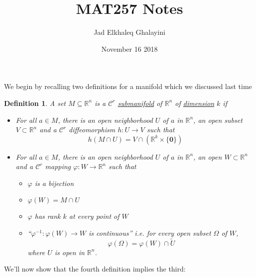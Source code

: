 \documentclass{article}
\title{MAT257 Notes}
\author{Jad Elkhaleq Ghalayini}
\date{November 16 2018}
\newtheorem{definition}{Definition}
\newcommand{\reals}[0]{\mathbb{R}}
\newcommand{\mc}[1]{\mathcal{#1}}
\newcommand{\mb}[1]{\mathbf{#1}}
\begin{document}
\maketitle

We begin by recalling two definitions for a manifold which we discussed last time
\begin{definition}
  A set \(M \subseteq \reals^n\) is a \(\mc{C}^r\) \underline{submanifold} of \(\reals^n\) of \underline{dimension} \(k\) if
  \begin{itemize}

    \item [3.] For all \(a \in M\), there is an open neighborhood \(U\) of \(a\) in \(\reals^n\), an open subset \(V \subset \reals^n\) and a \(\mc{C}^r\) diffeomorphism \(h: U \to V\) such that
    \[h(M \cap U) = V \cap (\reals^k \times \{\mb{0}\})\]

    \item [4.] For all \(a \in M\), there is an open neighborhood \(U\) of \(a\) in \(\reals^n\), an open \(W \subset \reals^n\) and a \(\mc{C}^r\) mapping \(\varphi: W \to \reals^n\) such that
    \begin{itemize}

      \item \(\varphi\) is a bijection

      \item \(\varphi(W) = M \cap U\)

      \item \(\varphi\) has rank \(k\) at every point of \(W\)

      \item ``\(\varphi^{-1}: \varphi(W) \to W\) is continuous'' i.e. for every open subset \(\Omega\) of \(W\),
      \[\varphi(\Omega) = \varphi(W) \cap \widetilde U\]
      where \(U\) is open in \(\reals^n\).
    \end{itemize}

  \end{itemize}
\end{definition}
We'll now show that the fourth definition implies the third:
\end{document}
